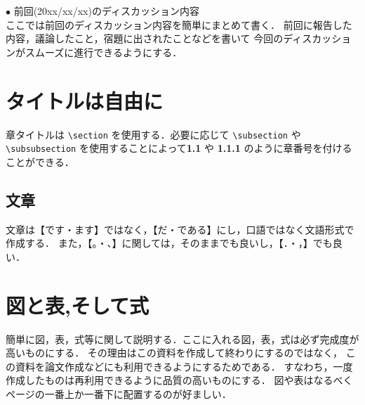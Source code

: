\documentclass[11pt, a4paper]{jarticle}
\begin{document}
\author{M1 立命 太郎} %
\date{2014/01/16} %

\maketitle %



\noindent
$\bullet$ 前回(20xx/xx/xx)のディスカッション内容\\
ここでは前回のディスカッション内容を簡単にまとめて書く．
前回に報告した内容，議論したこと，宿題に出されたことなどを書いて
今回のディスカッションがスムーズに進行できるようにする\cite{aa}．



\section{タイトルは自由に}
章タイトルは
\verb+\section+
を使用する．必要に応じて
\verb+\subsection+
や 
\verb+\subsubsection+
を使用することによって{\bf 1.1} や {\bf 1.1.1} のように章番号を付けることができる\cite{bb}．



\subsection{文章}
文章は【です・ます】ではなく，【だ・である】にし，口語ではなく文語形式で作成する．
また，【。・、】に関しては，そのままでも良いし，【．・，】でも良い．

\section{図と表,そして式}
簡単に図，表，式等に関して説明する．ここに入れる図，表，式は必ず完成度が高いものにする．
その理由はこの資料を作成して終わりにするのではなく，
この資料を論文作成などにも利用できるようにするためである．
すなわち，一度作成したものは再利用できるように品質の高いものにする．
図や表はなるべくページの一番上か一番下に配置するのが好ましい．
\end{document}
